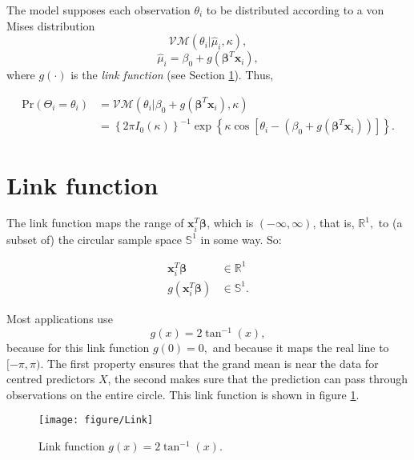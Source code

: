 \documentclass{article}\usepackage[]{graphicx}\usepackage[]{color}
\newenvironment{knitrout}{}{} %
\begin{document}
The model supposes each observation $\theta_i$ to be distributed according to a von Mises distribution $$ \mathcal{VM}(\theta_i \vert \hat\mu_i, \kappa),$$  $$\hat\mu_i = \beta_0 + g(\boldsymbol\beta^T \boldsymbol{x}_i),$$ where $g(\cdot)$ is the \textit{link function} (see Section \ref{link}). Thus,

\begin{align*}
\text{Pr}(\Theta_i = \theta_i) &=  \mathcal{VM}(\theta_i \vert \beta_0 + g(\boldsymbol\beta^T \boldsymbol{x}_i), \kappa) \\
&= \left\lbrace 2 \pi I_0(\kappa) \right\rbrace^{-1} \exp \left\lbrace \kappa \cos \left[ \theta_i - (\beta_0 + g(\boldsymbol\beta^T \boldsymbol{x}_i)) \right]  \right\rbrace. 
\end{align*}

\section{Link function} \label{link}

The link function maps the range of $\boldsymbol{x}_i^T \boldsymbol\beta$, which is $(-\infty, \infty)$, that is, $\mathbb{R}^1,$ to (a subset of) the circular sample space $\mathbb{S}^1$ in some way. So:

\begin{align}
\boldsymbol{x}_i^T \boldsymbol\beta &\in \mathbb{R}^1 \\
g(\boldsymbol{x}_i^T \boldsymbol\beta) &\in \mathbb{S}^1.
\end{align}

Most applications use $$g(x) = 2 \tan^{-1}(x),$$ because for this link function $g(0) = 0,$ and because it maps the real line to $[-\pi, \pi).$ The first property ensures that the grand mean is near the data for centred predictors $X$, the second makes sure that the prediction can pass through observations on the entire circle. This link function is shown in figure \ref{linkfunc}.

\begin{figure}
\begin{knitrout}
\color{fgcolor}

{\centering \texttt{[image: figure/Link]} 

}



\end{knitrout}

\caption{Link function $g(x) = 2 \tan^{-1}(x).$}
\label{linkfunc}
\end{figure}
\end{document}

